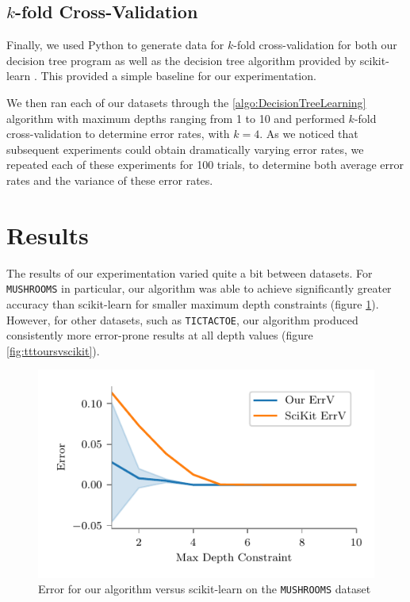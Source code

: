 \documentclass[screen, authorversion, nonacm, sigconf]{acmart}
\begin{document}
\subsection{$k$-fold Cross-Validation}

Finally, we used Python to generate data for $k$-fold cross-validation for both our decision tree program as well as the decision tree algorithm provided by scikit-learn \cite{scikit-learn}. This provided a simple baseline for our experimentation.

We then ran each of our datasets through the \ref{algo:DecisionTreeLearning} algorithm with maximum depths ranging from 1 to 10 and performed $k$-fold cross-validation to determine error rates, with $k = 4$. As we noticed that subsequent experiments could obtain dramatically varying error rates, we repeated each of these experiments for 100 trials, to determine both average error rates and the variance of these error rates.

\section{Results}

The results of our experimentation varied quite a bit between datasets. For \texttt{MUSHROOMS} in particular, our algorithm was able to achieve significantly greater accuracy than scikit-learn for smaller maximum depth constraints (figure \ref{fig:mushoursvscikit}). However, for other datasets, such as \texttt{TICTACTOE}, our algorithm produced consistently more error-prone results at all depth values (figure \ref{fig:tttoursvscikit}).

\begin{figure}
  \centering
  \includegraphics[width=\columnwidth]{figures/chart_ours_v_scikit_variance_mushrooms.pdf}
  \caption{Error for our algorithm versus scikit-learn on the \texttt{MUSHROOMS} dataset}
  \label{fig:mushoursvscikit}
\end{figure}
\end{document}
